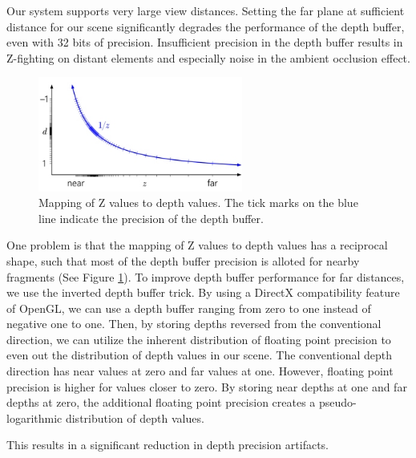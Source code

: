 Our system supports very large view distances.
Setting the far plane at sufficient distance for our scene significantly degrades the performance of the depth buffer, even with 32 bits of precision.
Insufficient precision in the depth buffer results in Z-fighting on distant elements and especially noise in the ambient occlusion effect.

\begin{figure}
	\centering
		\includegraphics[width=0.6\textwidth]{figures/nvidia_precision_1.jpg}
	\caption{Mapping of Z values to depth values. The tick marks on the blue line indicate the precision of the depth buffer.}
	\label{fig:nvidia_precision_1}
\end{figure}

One problem is that the mapping of Z values to depth values has a reciprocal shape, such that most of the depth buffer precision is alloted for nearby fragments (See Figure \ref{fig:nvidia_precision_1}).
To improve depth buffer performance for far distances, we use the inverted depth buffer trick. \cite{nvidia_depth_precision}
By using a DirectX compatibility feature of OpenGL, we can use a depth buffer ranging from zero to one instead of negative one to one.
Then, by storing depths reversed from the conventional direction, we can utilize the inherent distribution of floating point precision to even out the distribution of depth values in our scene.
The conventional depth direction has near values at zero and far values at one.
However, floating point precision is higher for values closer to zero.
By storing near depths at one and far depths at zero, the additional floating point precision creates a pseudo-logarithmic distribution of depth values.

This results in a significant reduction in depth precision artifacts.
